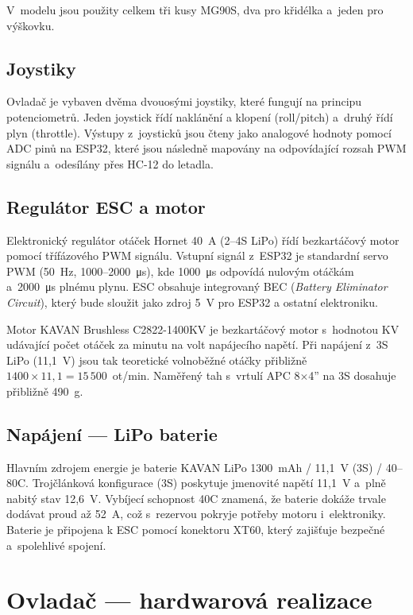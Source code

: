 \documentclass[12pt, a4paper, oneside]{report}
\begin{document}
V~modelu jsou použity celkem tři kusy MG90S, dva pro křidélka
a~jeden pro výškovku.

\subsection{Joystiky}

Ovladač je vybaven dvěma dvouosými joystiky, 
které fungují na principu potenciometrů. Jeden joystick řídí naklánění a klopení (roll/pitch) a~druhý řídí plyn (throttle). 
Výstupy z~joysticků jsou čteny jako analogové hodnoty pomocí ADC pinů na ESP32, které jsou následně mapovány na odpovídající rozsah PWM signálu a~odesílány přes HC-12 do letadla.
 
\subsection{Regulátor ESC a motor}
 
Elektronický regulátor otáček Hornet 40~A (2--4S LiPo) řídí
bezkartáčový motor pomocí třífázového PWM signálu. Vstupní signál
z~ESP32 je standardní servo PWM (50~Hz, 1000--2000~\si{\micro\second}),
kde 1000~\si{\micro\second} odpovídá nulovým otáčkám a~2000~\si{\micro\second}
plnému plynu. ESC obsahuje integrovaný BEC (\textit{Battery Eliminator Circuit}),
který bude sloužit jako zdroj 5~V pro ESP32 a ostatní elektroniku.
 
Motor KAVAN Brushless C2822-1400KV je bezkartáčový motor
s~hodnotou KV udávající počet otáček za minutu na volt napájecího napětí.
Při napájení z~3S LiPo (11{,}1~V) jsou tak teoretické volnoběžné otáčky
přibližně $1400 \times 11{,}1 = 15\,500$~ot/min.
Naměřený tah s~vrtulí APC 8$\times$4'' na 3S dosahuje přibližně 490~g.
 
\subsection{Napájení --- LiPo baterie}
 
Hlavním zdrojem energie je baterie KAVAN LiPo 1300~mAh / 11{,}1~V (3S) / 40--80C.
Trojčlánková konfigurace (3S) poskytuje jmenovité napětí 11{,}1~V
a~plně nabitý stav 12{,}6~V. Vybíjecí schopnost 40C znamená,
že baterie dokáže trvale dodávat proud až 52~A,
což s~rezervou pokryje potřeby motoru i~elektroniky. 
Baterie je připojena k ESC pomocí konektoru XT60, 
který zajišťuje bezpečné a~spolehlivé spojení. 

\section{Ovladač --- hardwarová realizace}
\end{document}
